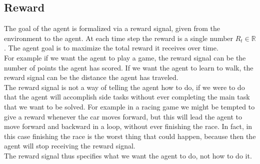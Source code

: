 \subsection{Reward}
The goal of the agent is formalized via a reward signal, given from the environment to the agent. At each time step the reward is a single number $R_t \in \mathbb{R}$. The agent goal is to maximize the total reward it receives over time.\\
For example if we want the agent to play a game, the reward signal can be the number of points the agent has scored. If we want the agent to learn to walk, the reward signal can be the distance the agent has traveled.\\
The reward signal is not a way of telling the agent how to do, if we were to do that the agent will accomplish side tasks without ever completing the main task that we want to be solved. For example in a racing game we might be tempted to give a reward whenever the car moves forward, but this will lead the agent to move forward and backward in a loop, without ever finishing the race. In fact, in this case finishing the race is the worst thing that could happen, because then the agent will stop receiving the reward signal.\\
The reward signal thus specifies what we want the agent to do, not how to do it.

